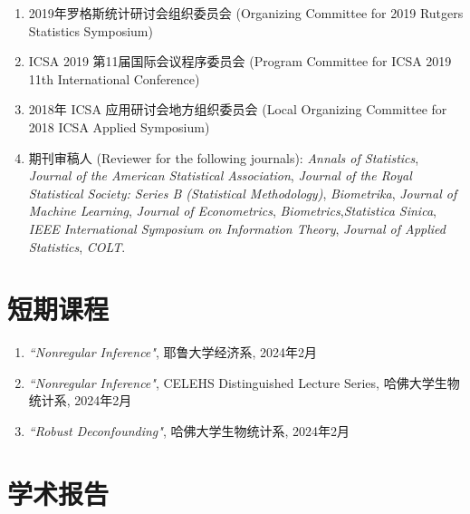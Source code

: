 \documentclass[margin, line]{res}
\begin{document}
\begin{resume}
\begin{enumerate}
\begin{itemize}
                    \item 研究生课程委员会 (Graduate Curriculum committee, 2019-2021)
                \end{itemize}

            \item 2019年罗格斯统计研讨会组织委员会 (Organizing Committee for 2019 Rutgers Statistics Symposium)

            \item ICSA 2019 第11届国际会议程序委员会 (Program Committee for ICSA 2019 11th International Conference)

            \item 2018年 ICSA 应用研讨会地方组织委员会 (Local Organizing Committee for 2018 ICSA Applied Symposium)

            \item 期刊审稿人 (Reviewer for the following journals): {\it Annals of Statistics}, {\it Journal of the American Statistical Association},
                {\it Journal of the Royal Statistical Society: Series B (Statistical Methodology)},
                {\it Biometrika}, {\it Journal of Machine Learning}, {\it Journal of Econometrics},
                {\it Biometrics},{\it Statistica Sinica}, {\it IEEE International Symposium on Information Theory},
                {\it Journal of Applied Statistics}, {\it COLT}.
        \end{enumerate}

		\vspace*{1mm}

		\section{\sc 短期课程}

		\begin{enumerate}
            \setlength{\itemsep}{3pt}

            \item {\it ``Nonregular Inference"}, 耶鲁大学经济系, 
                2024年2月

            \item {\it ``Nonregular Inference"}, CELEHS Distinguished Lecture Series, 
            哈佛大学生物统计系, 2024年2月

            \item {\it ``Robust Deconfounding"}, 哈佛大学生物统计系, 
                2024年2月
        \end{enumerate}

		\section{\sc 学术报告}


\end{resume}
\end{document}
